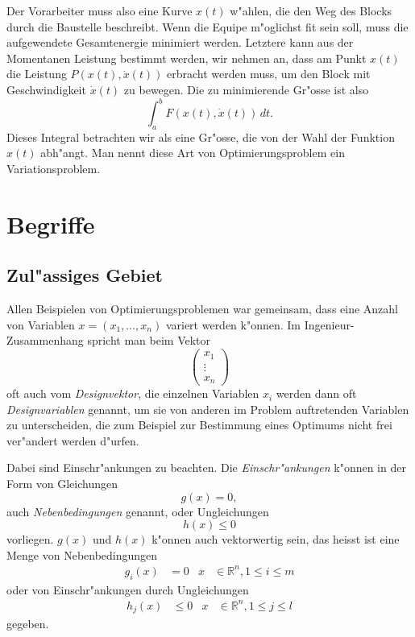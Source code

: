 Der Vorarbeiter muss also eine
Kurve $x(t)$ w"ahlen, die den Weg des Blocks durch die Baustelle
beschreibt.
Wenn die Equipe m"oglichst fit sein soll, muss die aufgewendete
Gesamtenergie minimiert werden. 
Letztere kann aus der Momentanen Leistung bestimmt werden, wir 
nehmen an, dass am Punkt $x(t)$ die Leistung $P(x(t), \dot x(t))$
erbracht werden muss, um den Block mit Geschwindigkeit $\dot x(t)$
zu bewegen. Die zu minimierende Gr"osse ist also
\[
\int_a^bF(x(t), \dot x(t))\,dt.
\]
Dieses Integral betrachten wir als eine Gr"osse, die von der Wahl
der Funktion $x(t)$ abh"angt. Man nennt diese Art von Optimierungsproblem 
ein Variationsproblem.

\section{Begriffe\label{section-begriffe}}
\subsection{Zul"assiges Gebiet}
Allen Beispielen von Optimierungsproblemen war gemeinsam, dass eine
Anzahl von Variablen $x=(x_1,\dots,x_n)$ variert werden k"onnen.
Im Ingenieur-Zusammenhang spricht man beim Vektor 
\[
\begin{pmatrix}
x_1\\\vdots\\x_n
\end{pmatrix}
\]
oft auch vom {\em Designvektor}, die einzelnen Variablen $x_i$ werden
dann oft {\em Designvariablen} genannt, um sie von anderen im Problem
auftretenden Variablen zu unterscheiden, die zum Beispiel zur Bestimmung
eines Optimums nicht frei ver"andert werden d"urfen.

Dabei sind Einschr"ankungen zu beachten.
Die {\em Einschr"ankungen} k"onnen in der Form von Gleichungen
\begin{equation}
g(x)=0,
\label{begriff-nebenbedingungen}
\end{equation}
auch {\em Nebenbedingungen} genannt, oder Ungleichungen
\begin{equation}
h(x)\le 0
\label{begriff-einschraenkungen}
\end{equation}
vorliegen.
$g(x)$ und $h(x)$ k"onnen auch vektorwertig sein,
das heisst ist eine Menge von Nebenbedingungen
\begin{align*}
g_i(x)&=0&x&\in\mathbb R^n, 1\le i\le m
\end{align*}
oder von Einschr"ankungen durch Ungleichungen
\begin{align*}
h_j(x)&\le 0&x&\in\mathbb R^n, 1\le j\le l
\end{align*}
gegeben.

